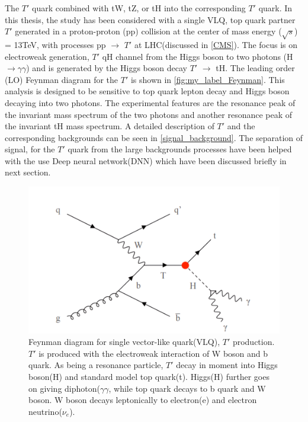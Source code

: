 




The $T'$ quark combined with tW, tZ, or tH into the corresponding $T'$ quark. 
 In this thesis, the study  has been considered with a single VLQ, top quark partner $T'$  generated in a proton-proton (pp) collision at the center of mass energy ($\sqrt{s}$) = 13TeV, with processes pp $\longrightarrow$ $T'$ at LHC(discussed in \autoref{CMS}). The focus is on electroweak generation, $T'$ qH channel from the Higgs boson to two photons (H $\longrightarrow\gamma\gamma$) and is generated by the Higgs boson decay $T'$ $\longrightarrow$ tH. The leading order (LO) Feynman diagram for the $T'$ is shown in \autoref{fig:my_label_Feynman}. This analysis is designed to be sensitive to  top quark lepton decay and Higgs boson decaying into two photons. The experimental features are the resonance peak of the invariant mass spectrum of the two photons and another resonance peak of the invariant tH  mass spectrum. A detailed description of $T'$ and the corresponding backgrounds can be seen in \autoref{signal_background}. 
The separation of signal, for the $T'$ quark from the large backgrounds processes have been helped with the use Deep neural network(DNN) which have been discussed briefly in next section.


   




\begin{figure}[H]
    \centering
    \includegraphics{figure_4/3.png}
    \caption{Feynman diagram for single vector-like quark(VLQ), ${T'}$ production. $T'$ is produced with the electroweak interaction of W boson and b quark. As being a resonance particle, $T'$ decay in moment into Higgs boson(H) and standard model top quark(t). Higgs(H) further goes on giving diphoton($\gamma\gamma$, while top quark decays to b quark and W boson. W boson decays leptonically to electron(e) and electron neutrino($\nu_e$).}
    \label{fig:my_label_Feynman}
\end{figure}

